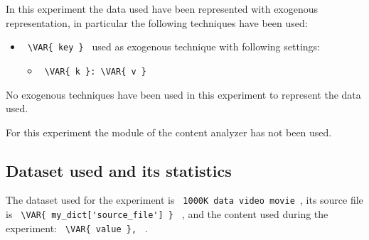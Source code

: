 

In this experiment the data used have been represented with exogenous representation, in particular the
following techniques have been used:
\begin{itemize}
    \item
     \verb| \VAR{ key } | used as exogenous technique with following settings:
     \begin{itemize}
             \item
             \verb| \VAR{ k }: \VAR{ v }|
     \end{itemize}
\end{itemize}
No exogenous techniques have been used in this experiment to represent the data used.




For this experiment the module of the content analyzer has not been used.
\hfill\break
\hfill\break



\hfill\break
\subsection{Dataset used and its statistics}
The dataset used for the experiment is  \lstinline[style=verbatim-text]| 1000K data video movie |,
its source file is \lstinline[style=verbatim-text]| \VAR{ my_dict['source_file'] } | ,
and the content used during the experiment:
     \verb| \VAR{ value }, |
.


